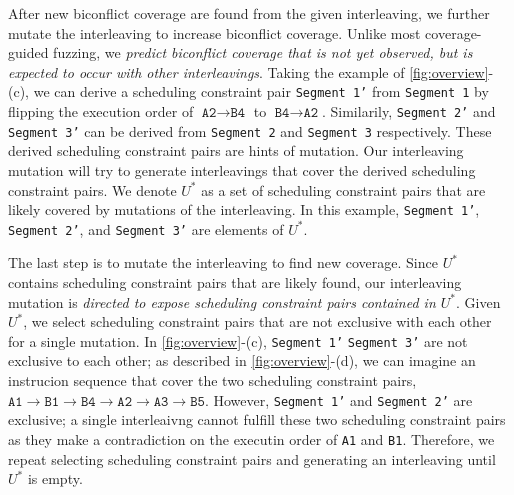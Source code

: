 %
After new biconflict coverage are found from the given interleaving,
we further mutate the interleaving to increase biconflict coverage.
%
Unlike most coverage-guided fuzzing, we \textit{predict biconflict
  coverage that is not yet observed, but is expected to occur with
  other interleavings}.
%
Taking the example of \autoref{fig:overview}-(c), we can derive a
scheduling constraint pair \texttt{Segment 1'} from \texttt{Segment 1}
by flipping the execution order of
$\texttt{A2} \rightarrow \texttt{B4}$ to
$\texttt{B4} \rightarrow \texttt{A2}$.
%
Similarily, \texttt{Segment 2'} and \texttt{Segment 3'} can be derived
from \texttt{Segment 2} and \texttt{Segment 3} respectively.
%
These derived scheduling constraint pairs are hints of mutation. Our
interleaving mutation will try to generate interleavings that cover
the derived scheduling constraint pairs.
%
We denote $U^*$ as a set of scheduling constraint pairs that are
likely covered by mutations of the interleaving. In this example,
\texttt{Segment 1'}, \texttt{Segment 2'}, and \texttt{Segment 3'} are
elements of $U^*$.


The last step is to mutate the interleaving to find new
coverage. Since $U^*$ contains scheduling constraint pairs that are
likely found, our interleaving mutation is \textit{directed to expose
  scheduling constraint pairs contained in $U^*$}.
%
Given $U^*$, we select scheduling constraint pairs that are not
exclusive with each other for a single mutation.
%
In \autoref{fig:overview}-(c), \texttt{Segment 1'} \texttt{Segment 3'}
are not exclusive to each other; as described in
\autoref{fig:overview}-(d), we can imagine an instrucion sequence that
cover the two scheduling constraint pairs,
$\texttt{A1} \rightarrow \texttt{B1} \rightarrow \texttt{B4}
\rightarrow \texttt{A2} \rightarrow \texttt{A3} \rightarrow
\texttt{B5}$.
%
However, \texttt{Segment 1'} and \texttt{Segment 2'} are exclusive; a
single interleaivng cannot fulfill these two scheduling constraint
pairs as they make a contradiction on the executin order of
\texttt{A1} and \texttt{B1}.
%
Therefore, we repeat selecting scheduling constraint pairs and
generating an interleaving until $U^*$ is empty.











